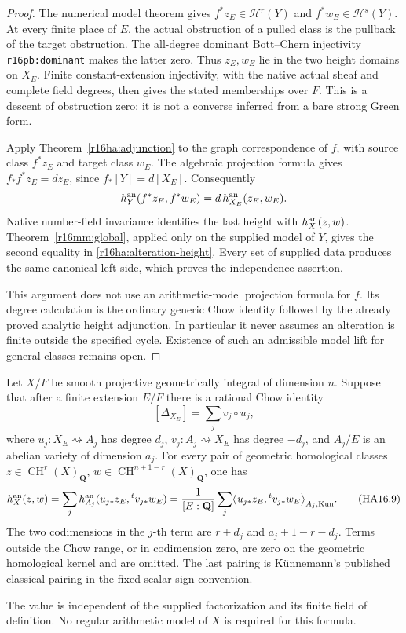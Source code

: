 \begin{proof}
The numerical model theorem gives
$f^*z_E\in\mathcal H^r(Y)$ and
$f^*w_E\in\mathcal H^s(Y)$. At every finite place of $E$,
the actual obstruction of a pulled class is the pullback of the
target obstruction. The all-degree dominant Bott--Chern
injectivity \texttt{r16pb:dominant} makes the latter zero.
Thus $z_E,w_E$ lie in the two height domains on $X_E$.
Finite constant-extension injectivity, with the native actual
sheaf and complete field degrees, then gives the stated
memberships over $F$. This is a descent of obstruction zero;
it is not a converse inferred from a bare strong Green form.

Apply Theorem~\ref{r16ha:adjunction} to the graph correspondence
of $f$, with source class $f^*z_E$ and target class $w_E$.
The algebraic projection formula gives
$f_*f^*z_E=d z_E$, since $f_*[Y]=d[X_E]$.
Consequently
\[
                 h_Y^{\rm an}(f^*z_E,f^*w_E)
                         =d\,h_{X_E}^{\rm an}(z_E,w_E).
\]
Native number-field invariance identifies the last height with
$h_X^{\rm an}(z,w)$. Theorem~\ref{r16mm:global}, applied only
on the supplied model of $Y$, gives the second equality in
\eqref{r16ha:alteration-height}. Every set of supplied data
produces the same canonical left side, which proves the
independence assertion.

This argument does not use an arithmetic-model projection
formula for $f$. Its degree calculation is the ordinary generic
Chow identity followed by the already proved analytic height
adjunction. In particular it never assumes an alteration is
finite outside the specified cycle. Existence of such an
admissible model lift for general classes remains open.
\end{proof}

\begin{corollary}
\label{r16ha:motivic-formula}
Let $X/F$ be smooth projective geometrically integral of
dimension $n$. Suppose that after a finite extension $E/F$
there is a rational Chow identity
\[
                 [\Delta_{X_E}]=\sum_j v_j\circ u_j,
 \tag{HA16.8}\label{r16ha:factorization}
\]
where $u_j:X_E\rightsquigarrow A_j$ has degree $d_j$,
$v_j:A_j\rightsquigarrow X_E$ has degree $-d_j$, and
$A_j/E$ is an abelian variety of dimension $a_j$.
For every pair of geometric homological classes
$z\in\operatorname{CH}^r(X)_{\mathbf Q}$,
$w\in\operatorname{CH}^{n+1-r}(X)_{\mathbf Q}$, one has
\[
 h_X^{\rm an}(z,w)
   =\sum_j h_{A_j}^{\rm an}
                   (u_{j*}z_E,{}^tv_{j*}w_E)
   =\frac1{[E:\mathbf Q]}\sum_j
        \bigl\langle u_{j*}z_E,{}^tv_{j*}w_E\bigr\rangle_{A_j,\mathrm{Kun}}.
 \tag{HA16.9}\label{r16ha:motivic-height}
\]
The two codimensions in the $j$-th term are
$r+d_j$ and $a_j+1-r-d_j$. Terms outside the Chow range, or
in codimension zero, are zero on the geometric homological
kernel and are omitted. The last pairing is K\"unnemann's
published classical pairing in the fixed scalar sign convention.

The value is independent of the supplied factorization and its
finite field of definition. No regular arithmetic model of
$X$ is required for this formula.
\end{corollary}

